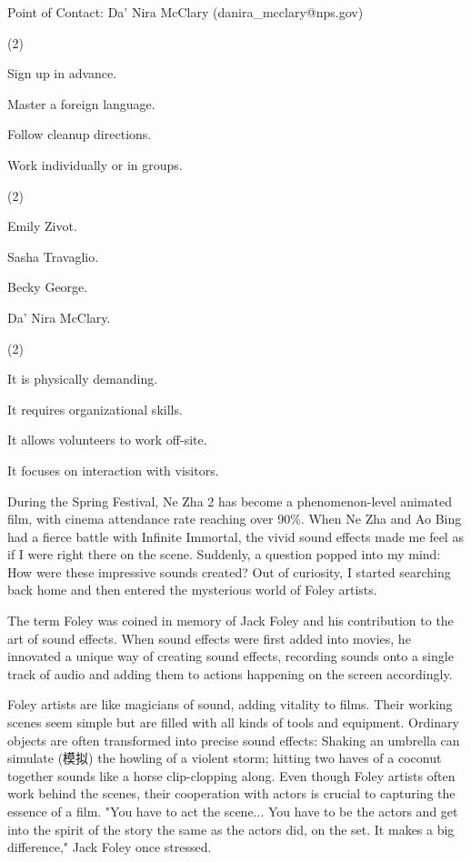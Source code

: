 \documentclass{英语试卷}
\begin{document}
\par Point of Contact: Da' Nira McClary (danira\_mcclary@nps.gov)\par
{}
\begin{choices}(2)
  \item Sign up in advance.
  \item Master a foreign language.
  \item Follow cleanup directions.
  \item Work individually or in groups.
\end{choices}
\begin{choices}(2)
  \item Emily Zivot.
  \item Sasha Travaglio.
  \item Becky George.
  \item Da' Nira McClary.
\end{choices}
\begin{choices}(2)
  \item It is physically demanding.
  \item It requires organizational skills.
  \item It allows volunteers to work off-site.
  \item It focuses on interaction with visitors.
\end{choices}
\par During the Spring Festival, Ne Zha 2 has become a phenomenon-level animated film, with cinema attendance rate reaching over 90\%. When Ne Zha and Ao Bing had a fierce battle with Infinite Immortal, the vivid sound effects made me feel as if I were right there on the scene. Suddenly, a question popped into my mind: How were these impressive sounds created? Out of curiosity, I started searching back home and then entered the mysterious world of Foley artists.\par
\par The term Foley was coined in memory of Jack Foley and his contribution to the art of sound effects. When sound effects were first added into movies, he innovated a unique way of creating sound effects, recording sounds onto a single track of audio and adding them to actions happening on the screen accordingly.\par
\par Foley artists are like magicians of sound, adding vitality to films. Their working scenes seem simple but are filled with all kinds of tools and equipment. Ordinary objects are often transformed into precise sound effects: Shaking an umbrella can simulate (模拟) the howling of a violent storm; hitting two haves of a coconut together sounds like a horse clip-clopping along. Even though Foley artists often work behind the scenes, their cooperation with actors is crucial to capturing the essence of a film. "You have to act the scene... You have to be the actors and get into the spirit of the story the same as the actors did, on the set. It makes a big difference," Jack Foley once stressed.\par
\end{document}
